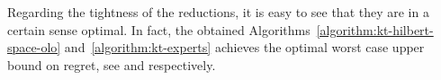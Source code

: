 Regarding the tightness of the reductions, it is easy to see that they are in a
certain sense optimal. In fact, the obtained
Algorithms~\ref{algorithm:kt-hilbert-space-olo} and~\ref{algorithm:kt-experts}
achieves the optimal worst case upper bound on regret, see \cite{Streeter-McMahan-2012,Orabona-2013}
and \cite{Cesa-Bianchi-Lugosi-2006} respectively.

